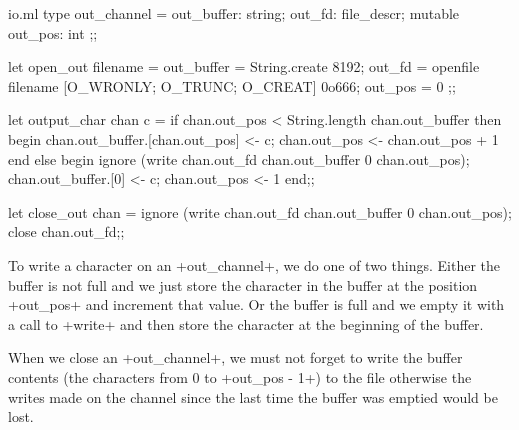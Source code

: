 \begin{myimage}[width="85\%"]
\end{myimage}
%
\begin{listingcodefile}{io.ml}
type out_channel =
  { out_buffer: string;
    out_fd: file_descr;
    mutable out_pos: int };;

let open_out filename =
  { out_buffer = String.create 8192;
    out_fd = openfile filename [O_WRONLY; O_TRUNC; O_CREAT] 0o666;
    out_pos = 0 };;

let output_char chan c =
  if chan.out_pos < String.length chan.out_buffer then begin
    chan.out_buffer.[chan.out_pos] <- c;
    chan.out_pos <- chan.out_pos + 1
  end else begin
    ignore (write chan.out_fd chan.out_buffer 0 chan.out_pos);
    chan.out_buffer.[0] <- c;
    chan.out_pos <- 1
  end;;

let close_out chan =
  ignore (write chan.out_fd chan.out_buffer 0 chan.out_pos);
  close chan.out_fd;;
\end{listingcodefile}
% 
To write a character on an \ml+out_channel+, we do one of two things.
Either the buffer is not full and we just store the character in the
buffer at the position \ml+out_pos+ and increment that value. Or the
buffer is full and we empty it with a call to \ml+write+ and then
store the character at the beginning of the buffer.
 
When we close an \ml+out_channel+, we must not forget to write the
buffer contents (the characters from 0 to \ml+out_pos - 1+) to the
file otherwise the writes made on the channel since the last time
the buffer was emptied would be lost.

